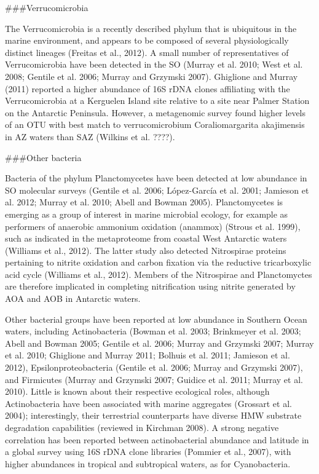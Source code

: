 ###Verrucomicrobia

The Verrucomicrobia is a recently described phylum that is ubiquitous in the marine environment, and appears to be composed of several physiologically distinct lineages (Freitas et al., 2012). A small number of representatives of Verrucomicrobia have been detected in the SO (Murray et al. 2010; West et al. 2008; Gentile et al. 2006; Murray and Grzymski 2007). Ghiglione and Murray (2011) reported a higher abundance of 16S rDNA clones affiliating with the Verrucomicrobia at a Kerguelen Island site relative to a site near Palmer Station on the Antarctic Peninsula. However, a metagenomic survey found higher levels of an OTU with best match to verrucomicrobium Coraliomargarita akajimensis in AZ waters than SAZ (Wilkins et al. ????). 


###Other bacteria

Bacteria of the phylum Planctomycetes have been detected at low abundance in SO molecular surveys (Gentile et al. 2006; López-García et al. 2001; Jamieson et al. 2012; Murray et al. 2010; Abell and Bowman 2005). Planctomycetes is emerging as a group of interest in marine microbial ecology, for example as performers of anaerobic ammonium oxidation (anammox) (Strous et al. 1999), such as indicated in the metaproteome from coastal West Antarctic waters (Williams et al., 2012). The latter study also detected Nitrospirae proteins pertaining to nitrite oxidation and carbon fixation via the reductive tricarboxylic acid cycle (Williams et al., 2012). Members of the Nitrospirae and Planctomyctes are therefore implicated in completing nitrification using nitrite generated by AOA and AOB in Antarctic waters.

Other bacterial groups have been reported at low abundance in Southern Ocean waters, including Actinobacteria (Bowman et al. 2003; Brinkmeyer et al. 2003; Abell and Bowman 2005; Gentile et al. 2006; Murray and Grzymski 2007; Murray et al. 2010; Ghiglione and Murray 2011; Bolhuis et al. 2011; Jamieson et al. 2012), Epsilonproteobacteria (Gentile et al. 2006; Murray and Grzymski 2007), and Firmicutes (Murray and Grzymski 2007; Guidice et al. 2011; Murray et al. 2010). Little is known about their respective ecological roles, although Actinobacteria have been associated with marine aggregates (Grossart et al. 2004); interestingly, their terrestrial counterparts have diverse HMW substrate degradation capabilities (reviewed in Kirchman 2008). A strong negative correlation has been reported between actinobacterial abundance and latitude in a global survey using 16S rDNA clone libraries (Pommier et al., 2007), with higher abundances in tropical and subtropical waters, as for Cyanobacteria.

